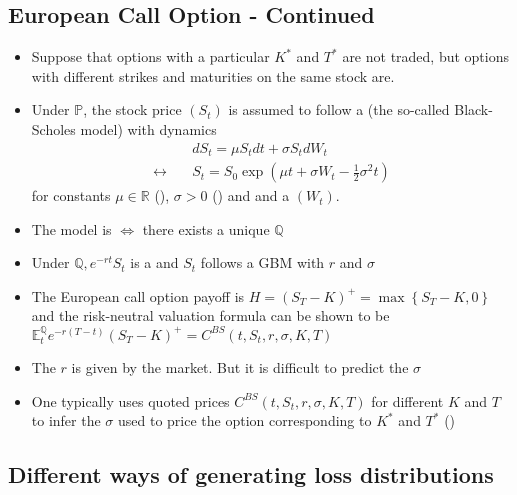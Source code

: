 \subsection*{European Call Option - Continued}
\begin{itemize}[leftmargin=*]
    \item Suppose that options with a particular  $K^{*}$ and  $T^{*}$ are not traded, but options with different strikes and maturities on the same stock are.

    \item Under $\mathbb{P}$, the stock price $\left(S_{t}\right)$ is assumed to follow a  (the so-called Black-Scholes model) with dynamics
$$
\begin{aligned}
&d S_{t}=\mu S_{t} d t+\sigma S_{t} d W_{t} \\
\leftrightarrow \quad &S_{t}=S_{0} \exp \left(\mu t+\sigma W_{t}-\frac{1}{2} \sigma^{2} t\right)
\end{aligned}
$$
for constants $\mu \in \mathbb{R}$ (), $\sigma>0$ () and and a  $\left(W_{t}\right)$.
    \item The model is  $\Leftrightarrow$ there exists a unique  $\mathbb{Q}$
    \item Under $\mathbb{Q}, e^{-r t} S_{t}$ is a  and $S_{t}$ follows a GBM with  $r$ and  $\sigma$
    \item The European call option payoff is $H=\left(S_{T}-K\right)^{+}=\max \left\{S_{T}-K, 0\right\}$ and the risk-neutral valuation formula can be shown to be
$
\mathbb{E}_{t}^{\mathbb{Q}} e^{-r(T-t)}\left(S_{T}-K\right)^{+}=C^{B S}\left(t, S_{t}, r, \sigma, K, T\right)
$
    \item The  $r$ is given by the market. But it is difficult to predict the  $\sigma$ 
    \item One typically uses quoted prices $C^{B S}\left(t, S_{t}, r, \sigma, K, T\right)$ for different $K$ and $T$ to infer the $\sigma$ used to price the option corresponding to $K^{*}$ and $T^{*}$ ()
\end{itemize}









\subsection*{Different ways of generating loss distributions}
